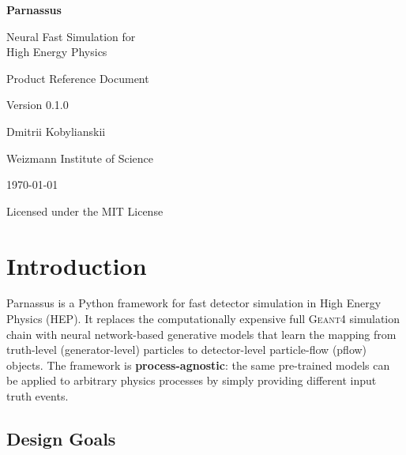 \documentclass[11pt,a4paper]{article}
\begin{document}
\begin{titlepage}
\centering
\vspace*{3cm}
{\Huge\bfseries\color{parnblue} Parnassus\par}
\vspace{0.5cm}
{\LARGE Neural Fast Simulation for\\High Energy Physics\par}
\vspace{2cm}
{\Large Product Reference Document\par}
\vspace{0.5cm}
{\large Version 0.1.0\par}
\vspace{2cm}
{\large Dmitrii Kobylianskii\par}
\vspace{0.3cm}
{\normalsize Weizmann Institute of Science\par}
\vspace{3cm}
{\large\today\par}
\vfill
{\small Licensed under the MIT License}
\end{titlepage}

\tableofcontents
\newpage

\section{Introduction}
\label{sec:introduction}

Parnassus is a Python framework for fast detector simulation in High Energy Physics (HEP).
It replaces the computationally expensive full \textsc{Geant4} simulation chain with neural
network-based generative models that learn the mapping from truth-level (generator-level)
particles to detector-level particle-flow (pflow) objects. The framework is
\textbf{process-agnostic}: the same pre-trained models can be applied to arbitrary physics
processes by simply providing different input truth events.

\subsection{Design Goals}
\end{document}
